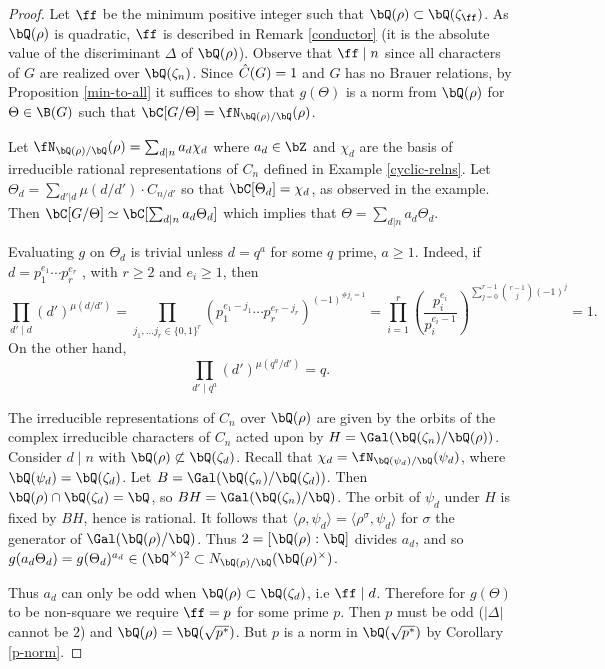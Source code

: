 \begin{proof}
    Let $\ff$ be the minimum positive integer such that $\bQ(\rho) \subset \bQ(\zeta_{\ff})$. As $\bQ(\rho)$ is quadratic, $\ff$ is described in Remark \ref{conductor} (it is the absolute value of the discriminant $\Delta$ of $\bQ(\rho)$). Observe that $\ff \mid n$ since all characters of $G$ are realized over $\bQ(\zeta_n)$. Since $\hat{C}(G) = 1$ and $G$ has no Brauer relations, by Proposition \ref{min-to-all} it suffices to show that $g(\Theta)$ is a norm from $\bQ(\rho)$ for $\Theta \in \B(G)$ such that $\bC[G / \Theta] = \repnorm{\rho}$.

    Let $\repnorm{\rho} = \sum_{d \mid n} a_d \chi_d$ where $a_d \in \bZ$ and $\chi_d$ are the basis of irreducible rational representations of $C_n$ defined in Example \ref{cyclic-relns}. %
    Let $\Theta_{d} = \sum_{d' | d}\mu(d / d')\cdot C_{n / d'}$ so that $\bC[\Theta_{d}] = \chi_{d}$, as observed in the example. Then $\bC[G / \Theta] \simeq \bC[\sum_{d | n } a_{d} \Theta_{d}]$ which implies that $\Theta = \sum_{d | n } a_{d} \Theta_{d}$.

    Evaluating $g$ on $\Theta_{d}$ is trivial unless $d = q^a$ for some $q$ prime, $a \geq 1$. Indeed, if $d = p_1^{e_1} \cdots p_r^{e_r}$ , with $r \geq 2$ and $e_i \geq 1$, then
    \[ \prod_{d' \mid d} (d')^{\mu(d / d')} = \prod_{j_1, \ldots j_r \in \{0,1\}^r } \left(p_1^{e_1 - j_1} \cdots p_r^{e_r - j_r}\right)^{(-1)^{\# j_i = 1}} = 
    \prod_{i = 1}^r \left(\frac{p_i^{e_i}}{p_i^{e_i - 1}}\right)^{\sum_{ j = 0}^{r - 1} \binom{r-1}{j} (-1)^j} = 1. \]
    On the other hand,
    \[ \prod_{d' \mid q^a} (d')^{\mu(q^a / d')} = q .\]
    
    The irreducible representations of $C_n$ over $\bQ(\rho)$ are given by the orbits of the complex irreducible characters of $C_n$ acted upon by $H = \Gal (\bQ(\zeta_n) / \bQ(\rho))$. Consider $d \mid n$ with $\bQ(\rho) \not\subset \bQ(\zeta_d)$. 
    Recall that $\chi_d = \repnorm{\psi_d}$, where $\bQ(\psi_d) = \bQ(\zeta_d)$. Let $B = \Gal(\bQ(\zeta_n) / \bQ(\zeta_d))$. Then $\bQ(\rho) \cap \bQ(\zeta_d) = \bQ$, so $BH = \Gal(\bQ(\zeta_n) / \bQ)$. The orbit of $\psi_{d}$ under $H$ is fixed by $BH$, hence is rational. It follows that $\langle \rho, \psi_{d} \rangle = \langle \rho^{\sigma} , \psi_{d} \rangle$ for $\sigma$ the generator of $\Gal(\bQ(\rho) / \bQ)$. Thus $2 = [\bQ(\rho) : \bQ]$ divides $a_d$, and so $g(a_d \Theta_d) = g(\Theta_d)^{a_d} \in (\bQ^{\times})^2 \subset \fieldnorm{\rho}$.

    Thus $a_d$ can only be odd when $\bQ(\rho) \subset \bQ(\zeta_d)$, i.e  $\ff \mid d$. Therefore for $g(\Theta)$ to be non-square we require $\ff = p$ for some prime $p$. Then $p$ must be odd ($|\Delta|$ cannot be $2$) and $\bQ(\rho) = \bQ(\sqrt{p^*})$. But $p$ is a norm in $\bQ(\sqrt{p^*})$ by Corollary \ref{p-norm}.
\end{proof}

